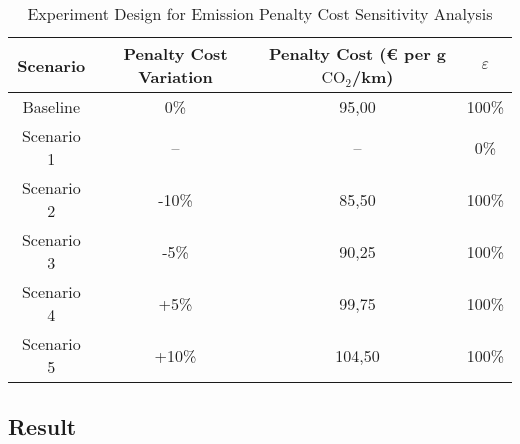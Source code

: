 \begin{table}[h]
\centering
\begin{tabular}{c|ccc}
\toprule
Scenario &Penalty Cost Variation&Penalty Cost (\euro{} per g $\text{CO}_{2}$/km)&$\varepsilon$\\
\midrule
Baseline&0\% & 95,00&100\% \\
Scenario 1&--&--&0\%\\
Scenario 2&-10\%&85,50&100\%\\
Scenario 3&-5\%&90,25&100\%\\
Scenario 4&+5\%&99,75&100\%\\
Scenario 5&+10\%&104,50&100\%\\
\bottomrule
\end{tabular}
\caption{Experiment Design for Emission Penalty Cost Sensitivity Analysis}\label{tab:scenariossecondexperiment}
\end{table}

\subsection{Result}\label{resultexperiment2}
